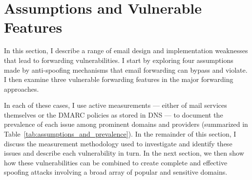 \section{Assumptions and Vulnerable Features}
\label{sec:assumptions}

In this section, I describe a range of email design and
implementation weaknesses that lead to forwarding vulnerabilities.
I start by exploring four assumptions made by anti-spoofing mechanisms
that email forwarding can bypass and violate.  I then examine
three vulnerable forwarding features in the major forwarding
approaches.

In each of these cases, I use active
measurements --- either of mail services themselves or the DMARC policies
as stored in DNS --- to document the prevalence of each issue
among prominent domains and
providers (summarized in Table~\ref{tab:assumptions_and_prevalence}).
In the remainder of this section, I discuss the measurement
methodology used to investigate and identify these issues and
describe each vulnerability in turn.  In the next section,
we then show how these vulnerabilities can
be combined to create complete and effective spoofing attacks
involving a broad array of popular and sensitive domains.






